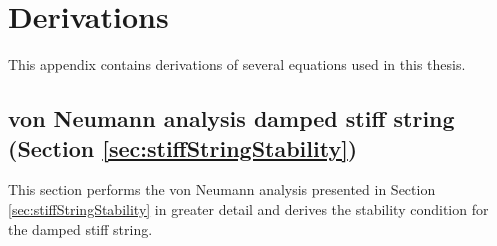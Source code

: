 \chapter{Derivations}\label{app:derivations}
\def\Psilp{\Psi_{l+1}^n}
\def\Psilm{\Psi_{l-1}^n}
\def\Psinp{\Psi_l^{n+1}}
\def\Psinm{\Psi_l^{n-1}}
This appendix contains derivations of several equations used in this thesis. 

\section{von Neumann analysis damped stiff string (Section \ref{sec:stiffStringStability})}\label{app:vonNeumannString}
This section performs the von Neumann analysis presented in Section \ref{sec:stiffStringStability} in greater detail and derives the stability condition for the damped stiff string.

